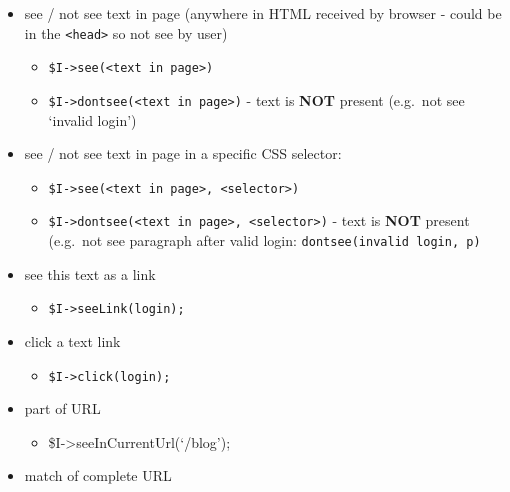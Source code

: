 \documentclass[a4paperpaper,openright]{book}
\providecommand{\tightlist}{%
  \setlength{\itemsep}{0pt}\setlength{\parskip}{0pt}}
\begin{document}
\begin{itemize}
\item
  see / not see text in page (anywhere in HTML received by browser -
  could be in the \texttt{\textless{}head\textgreater{}} so not see by
  user)

  \begin{itemize}
  \item
    \texttt{\$I-\textgreater{}see(\textless{}text\ in\ page\textgreater{})}
  \item
    \texttt{\$I-\textgreater{}dontsee(\textless{}text\ in\ page\textgreater{})}
    - text is \textbf{NOT} present (e.g.~not see `invalid login')
  \end{itemize}
\item
  see / not see text in page in a specific CSS selector:

  \begin{itemize}
  \item
    \texttt{\$I-\textgreater{}see(\textless{}text\ in\ page\textgreater{},\ \textquotesingle{}\textless{}selector\textgreater{})}
  \item
    \texttt{\$I-\textgreater{}dontsee(\textless{}text\ in\ page\textgreater{},\ \textquotesingle{}\textless{}selector\textgreater{}\textquotesingle{})}
    - text is \textbf{NOT} present (e.g.~not see paragraph after valid
    login:
    \texttt{dontsee(\textquotesingle{}invalid\ login\textquotesingle{},\ \textquotesingle{}p\textquotesingle{})}
  \end{itemize}
\item
  see this text as a link

  \begin{itemize}
  \tightlist
  \item
    \texttt{\$I-\textgreater{}seeLink(\textquotesingle{}login\textquotesingle{});}
  \end{itemize}
\item
  click a text link

  \begin{itemize}
  \tightlist
  \item
    \texttt{\$I-\textgreater{}click(\textquotesingle{}login\textquotesingle{});}
  \end{itemize}
\item
  part of URL

  \begin{itemize}
  \tightlist
  \item
    \$I-\textgreater{}seeInCurrentUrl(`/blog');
  \end{itemize}
\item
  match of complete URL


\end{itemize}
\end{document}
